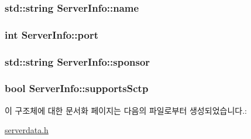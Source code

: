\hypertarget{struct_server_info_ac1b6c30ed482012324aee9a240007158}{
\subsubsection[{name}]{\setlength{\rightskip}{0pt plus 5cm}std\-::string Server\-Info\-::name}}\label{struct_server_info_ac1b6c30ed482012324aee9a240007158}
\hypertarget{struct_server_info_a8af087c39c4cfaf845feba73ad1bd9af}{
\subsubsection[{port}]{\setlength{\rightskip}{0pt plus 5cm}int Server\-Info\-::port}}\label{struct_server_info_a8af087c39c4cfaf845feba73ad1bd9af}
\hypertarget{struct_server_info_a019cc206a894a80b8254bf3798173a25}{
\subsubsection[{sponsor}]{\setlength{\rightskip}{0pt plus 5cm}std\-::string Server\-Info\-::sponsor}}\label{struct_server_info_a019cc206a894a80b8254bf3798173a25}
\hypertarget{struct_server_info_ad566c6729bf2eae019af64a50eb64f6b}{
\subsubsection[{supports\-Sctp}]{\setlength{\rightskip}{0pt plus 5cm}bool Server\-Info\-::supports\-Sctp}}\label{struct_server_info_ad566c6729bf2eae019af64a50eb64f6b}


이 구조체에 대한 문서화 페이지는 다음의 파일로부터 생성되었습니다.\-:\begin{DoxyCompactItemize}
\item 
\hyperlink{serverdata_8h}{serverdata.\-h}\end{DoxyCompactItemize}
